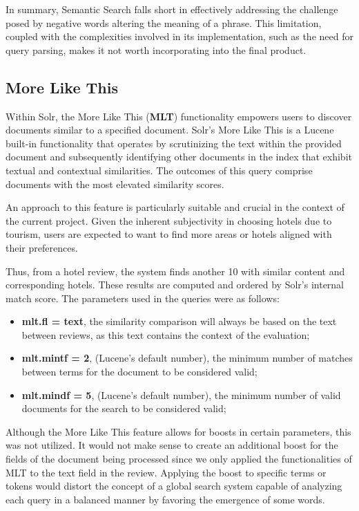 \documentclass[sigconf]{acmart}
\begin{document}
In summary, Semantic Search falls short in effectively addressing the challenge posed by negative words altering the meaning of a phrase. This limitation, coupled with the complexities involved in its implementation, such as the need for query parsing, makes it not worth incorporating into the final product.



\renewcommand{\thesubsection}{\arabic{section}.3}
\subsection{More Like This}

Within Solr, the More Like This (\textbf{MLT}) functionality empowers users to discover documents similar to a specified document. Solr's More Like This is a Lucene \cite{Lucene} built-in functionality that operates by scrutinizing the text within the provided document and subsequently identifying other documents in the index that exhibit textual and contextual similarities. The outcomes of this query comprise documents with the most elevated similarity scores.

An approach to this feature is particularly suitable and crucial in the context of the current project. Given the inherent subjectivity in choosing hotels due to tourism, users are expected to want to find more areas or hotels aligned with their preferences.

Thus, from a hotel review, the system finds another 10 with similar content and corresponding hotels. These results are computed and ordered by Solr's internal match score. The parameters used in the queries were as follows:

\begin{itemize}
    \item \textbf{mlt.fl = text}, the similarity comparison will always be based on the text between reviews, as this text contains the context of the evaluation;
    \item \textbf{mlt.mintf = 2}, (Lucene's default number), the minimum number of matches between terms for the document to be considered valid;
    \item \textbf{mlt.mindf = 5}, (Lucene's default number), the minimum number of valid documents for the search to be considered valid;
\end{itemize}

Although the More Like This feature allows for boosts in certain parameters, this was not utilized. It would not make sense to create an additional boost for the fields of the document being processed since we only applied the functionalities of MLT to the text field in the review. Applying the boost to specific terms or tokens would distort the concept of a global search system capable of analyzing each query in a balanced manner by favoring the emergence of some words.
\end{document}
